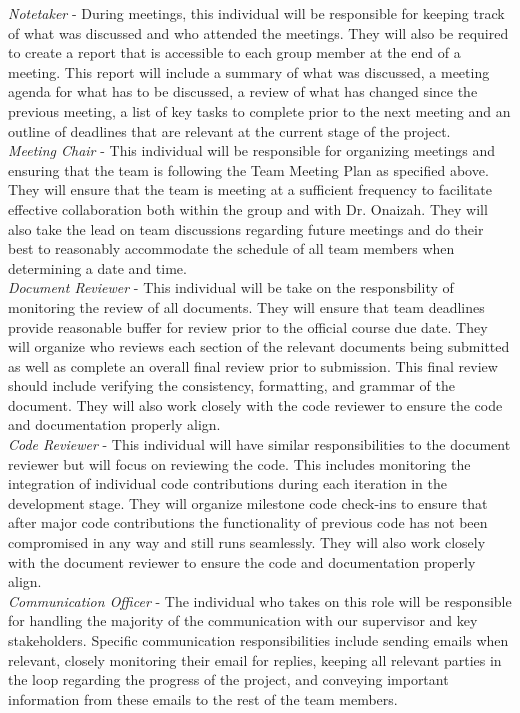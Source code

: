 \documentclass{article}
\begin{document}
\textit{Notetaker} - During meetings, this individual will be responsible for keeping track of what was discussed
and who attended the meetings. They will also be required to create a report that is accessible to each group member
at the end of a meeting. This report will include a summary of what was discussed, a meeting agenda for what has to
be discussed, a review of what has changed since the previous meeting, a list of key tasks to complete prior to the
next meeting and an outline of deadlines that are relevant at the current stage of the project.\\

\textit{Meeting Chair} - This individual will be responsible for organizing meetings and ensuring that the team is
following the Team Meeting Plan as specified above. They will ensure that the team is meeting at a sufficient
frequency to facilitate effective collaboration both within the group and with Dr. Onaizah. They will also take
the lead on team discussions regarding future meetings and do their best to reasonably accommodate the schedule of
all team members when determining a date and time.\\

\textit{Document Reviewer} - This individual will be take on the responsbility of monitoring the review of all
documents. They will ensure that team deadlines provide reasonable buffer for review prior to the official course
due date. They will organize who reviews each section of the relevant documents being submitted as well as complete
an overall final review prior to submission. This final review should include verifying the consistency,
formatting, and grammar of the document. They will also work closely with the code reviewer to ensure the code and
documentation properly align.\\

\textit{Code Reviewer} - This individual will have similar responsibilities to the document reviewer but will focus
on reviewing the code. This includes monitoring the integration of individual code contributions during each
iteration in the development stage. They will organize milestone code check-ins to ensure that after major code
contributions the functionality of previous code has not been compromised in any way and still runs seamlessly. They
will also work closely with the document reviewer to ensure the code and documentation properly align.\\

\textit{Communication Officer} - The individual who takes on this role will be responsible for handling the majority
of the communication with our supervisor and key stakeholders. Specific communication responsibilities include
sending emails when relevant, closely monitoring their email for replies, keeping all relevant parties in the loop
regarding the progress of the project, and conveying important information from these emails to the rest of the team
members.
\end{document}
